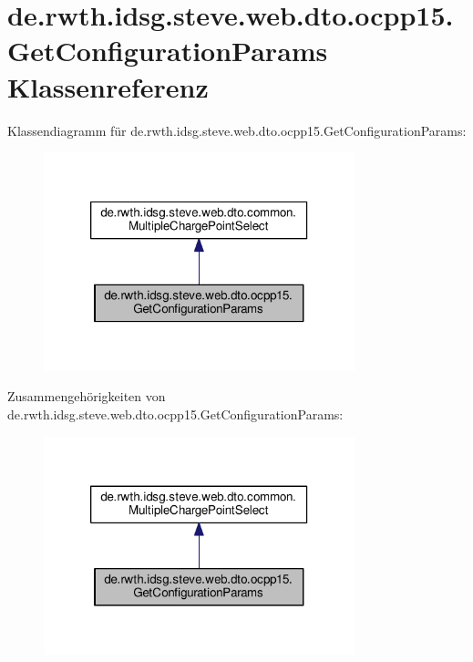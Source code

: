 \hypertarget{classde_1_1rwth_1_1idsg_1_1steve_1_1web_1_1dto_1_1ocpp15_1_1_get_configuration_params}{\section{de.\-rwth.\-idsg.\-steve.\-web.\-dto.\-ocpp15.\-Get\-Configuration\-Params Klassenreferenz}
\label{classde_1_1rwth_1_1idsg_1_1steve_1_1web_1_1dto_1_1ocpp15_1_1_get_configuration_params}
}


Klassendiagramm für de.\-rwth.\-idsg.\-steve.\-web.\-dto.\-ocpp15.\-Get\-Configuration\-Params\-:
\nopagebreak
\begin{figure}[H]
\begin{center}
\leavevmode
\includegraphics[width=256pt]{classde_1_1rwth_1_1idsg_1_1steve_1_1web_1_1dto_1_1ocpp15_1_1_get_configuration_params__inherit__graph}
\end{center}
\end{figure}


Zusammengehörigkeiten von de.\-rwth.\-idsg.\-steve.\-web.\-dto.\-ocpp15.\-Get\-Configuration\-Params\-:
\nopagebreak
\begin{figure}[H]
\begin{center}
\leavevmode
\includegraphics[width=256pt]{classde_1_1rwth_1_1idsg_1_1steve_1_1web_1_1dto_1_1ocpp15_1_1_get_configuration_params__coll__graph}
\end{center}
\end{figure}

